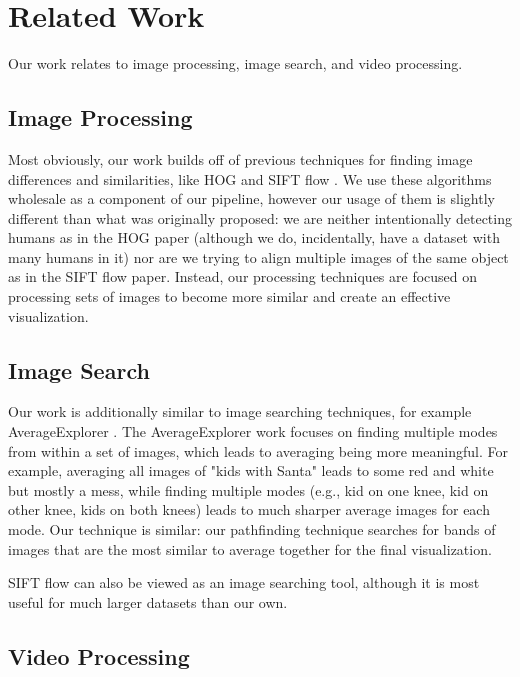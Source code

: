 
\section{Related Work}

Our work relates to image processing, image search, and video processing.

\subsection{Image Processing}

Most obviously, our work builds off of previous techniques for finding image differences and similarities, like HOG \cite{HOG} and SIFT flow \cite{SIFTflow}.  We use these algorithms wholesale as a component of our pipeline, however our usage of them is slightly different than what was originally proposed: we are neither intentionally detecting humans as in the HOG paper (although we do, incidentally, have a dataset with many humans in it) nor are we trying to align multiple images of the same object as in the SIFT flow paper.  Instead, our processing techniques are focused on processing sets of images to become more similar and create an effective visualization.

\subsection{Image Search}

Our work is additionally similar to image searching techniques, for example AverageExplorer \cite{averageExplorer}.  The AverageExplorer work focuses on finding multiple modes from within a set of images, which leads to averaging being more meaningful.  For example, averaging all images of "kids with Santa" leads to some red and white but mostly a mess, while finding multiple modes (e.g., kid on one knee, kid on other knee, kids on both knees) leads to much sharper average images for each mode.  Our technique is similar: our pathfinding technique searches for bands of images that are the most similar to average together for the final visualization.

SIFT flow \cite{SIFTflow} can also be viewed as an image searching tool, although it is most useful for much larger datasets than our own.

\subsection{Video Processing}
